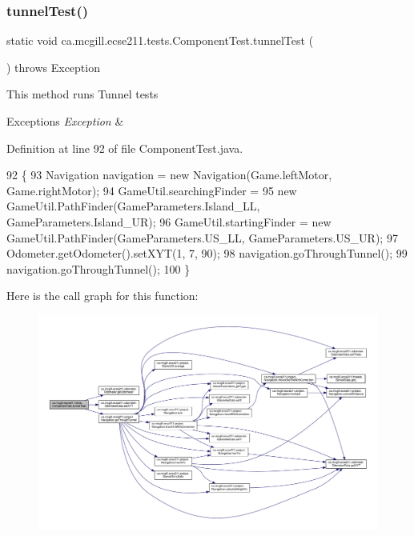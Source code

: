\subsubsection{\texorpdfstring{tunnel\+Test()}{tunnelTest()}}
{\footnotesize\ttfamily static void ca.\+mcgill.\+ecse211.\+tests.\+Component\+Test.\+tunnel\+Test (\begin{DoxyParamCaption}{ }\end{DoxyParamCaption}) throws Exception\hspace{0.3cm}{\ttfamily [static]}}

This method runs Tunnel tests


\begin{DoxyExceptions}{Exceptions}
{\em Exception} & \\
\hline
\end{DoxyExceptions}


Definition at line 92 of file Component\+Test.\+java.


\begin{DoxyCode}
92                                                    \{
93     Navigation navigation = \textcolor{keyword}{new} Navigation(Game.leftMotor, Game.rightMotor);
94     GameUtil.searchingFinder =
95         \textcolor{keyword}{new} GameUtil.PathFinder(GameParameters.Island\_LL, GameParameters.Island\_UR);
96     GameUtil.startingFinder = \textcolor{keyword}{new} GameUtil.PathFinder(GameParameters.US\_LL, GameParameters.US\_UR);
97     Odometer.getOdometer().setXYT(1, 7, 90);
98     navigation.goThroughTunnel();
99     navigation.goThroughTunnel();
100   \}
\end{DoxyCode}
Here is the call graph for this function\+:\nopagebreak
\begin{figure}[H]
\begin{center}
\leavevmode
\includegraphics[width=350pt]{enumca_1_1mcgill_1_1ecse211_1_1tests_1_1_component_test_ae85caa20c6391bacc4fdbd411ee3f113_cgraph}
\end{center}
\end{figure}
\mbox{\label{enumca_1_1mcgill_1_1ecse211_1_1tests_1_1_component_test_a05cd9d95458b11ed57ca001a28fffa7c}} 
